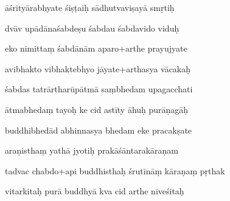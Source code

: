\documentclass[article,12pt,a4paper]{memoir}%
\newcounter{parCount}
\begin{document}
	  
	  \pstart \leavevmode%
	āśrityārabhyate śiṣṭaiḥ sādhutvaviṣayā smṛtiḥ 
	{}
	\pend%
      

	  
	  \pstart {} dvāv upādānaśabdeṣu śabdau śabdavido viduḥ 
	{}
	\pend%
      

	  
	  \pstart \leavevmode%
	eko nimittaṃ śabdānām aparo+arthe prayujyate 
	{}
	\pend%
      

	  
	  \pstart {} avibhakto vibhaktebhyo jāyate+arthasya vācakaḥ 
	{}
	\pend%
      

	  
	  \pstart \leavevmode%
	śabdas tatrārtharūpātmā saṃbhedam upagacchati 
	{}
	\pend%
      

	  
	  \pstart {} ātmabhedaṃ tayoḥ ke cid astīty āhuḥ purāṇagāḥ 
	{}
	\pend%
      

	  
	  \pstart \leavevmode%
	buddhibhedād abhinnasya bhedam eke pracakṣate 
	{}
	\pend%
      

	  
	  \pstart {} araṇisthaṃ yathā jyotiḥ prakāśāntarakāraṇam 
	{}
	\pend%
      

	  
	  \pstart \leavevmode%
	tadvac chabdo+api buddhisthaḥ śrutīnāṃ kāraṇaṃ pṛthak 
	{}
	\pend%
      

	  
	  \pstart {} vitarkitaḥ purā buddhyā kva cid arthe niveśitaḥ 
	{}
	\pend%
      
\end{document}
